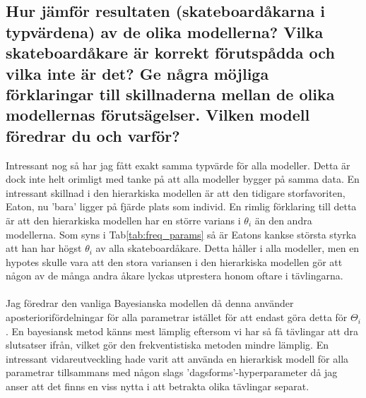 \documentclass{article}
\begin{document}
\subsection{Hur jämför resultaten (skateboardåkarna i typvärdena) av de olika modellerna? Vilka skateboardåkare är korrekt förutspådda och vilka inte är det? Ge några möjliga förklaringar till skillnaderna mellan de olika modellernas förutsägelser. Vilken modell föredrar du och varför?}
Intressant nog så har jag fått exakt samma typvärde för alla modeller. Detta är dock inte helt orimligt med tanke på att alla modeller bygger på samma data.
En intressant skillnad i den hierarkiska modellen är att den tidigare storfavoriten, Eaton, nu 'bara' ligger på fjärde plats som individ.
En rimlig förklaring till detta är att den hierarkiska modellen har en större varians i $\theta_i$ än den andra modellerna.
Som syns i Tab\ref{tab:freq_params} så är Eatons kankse största styrka att han har högst $\theta_i$ av alla skateboardåkare.
Detta håller i alla modeller, men en hypotes skulle vara att den stora variansen i den hierarkiska modellen gör att någon av de många andra åkare lyckas utprestera honom oftare i tävlingarna.
\\\\
Jag föredrar den vanliga Bayesianska modellen då denna använder aposteriorifördelningar för alla parametrar istället för att endast göra detta för $\Theta_i$.
En bayesiansk metod känns mest lämplig eftersom vi har så få tävlingar att dra slutsatser ifrån, vilket gör den frekventistiska metoden mindre lämplig.
En intressant vidareutveckling hade varit att använda en hierarkisk modell för alla parametrar tillsammans med någon slags 'dagsforms'-hyperparameter då jag anser att det finns en viss nytta i att betrakta olika tävlingar separat.
\end{document}
